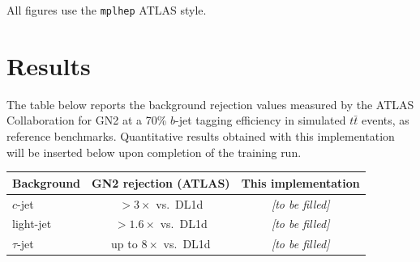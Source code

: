 \documentclass[11pt,a4paper]{article}
\begin{document}
All figures use the \texttt{mplhep} ATLAS style.

\section{Results}

The table below reports the background rejection values measured by the ATLAS
Collaboration for GN2 at a 70\% $b$-jet tagging efficiency in simulated
$t\bar{t}$ events, as reference benchmarks.
Quantitative results obtained with this implementation will be inserted below
upon completion of the training run.

\vspace{6pt}
\begin{center}
\begin{tabular}{lcc}
  \toprule
  Background & GN2 rejection (ATLAS) & This implementation \\
  \midrule
  $c$-jet    & $> 3\times$ vs.\ DL1d   & \textit{[to be filled]} \\
  light-jet  & $> 1.6\times$ vs.\ DL1d & \textit{[to be filled]} \\
  $\tau$-jet & up to $8\times$ vs.\ DL1d & \textit{[to be filled]} \\
  \bottomrule
\end{tabular}
\end{center}
\end{document}
